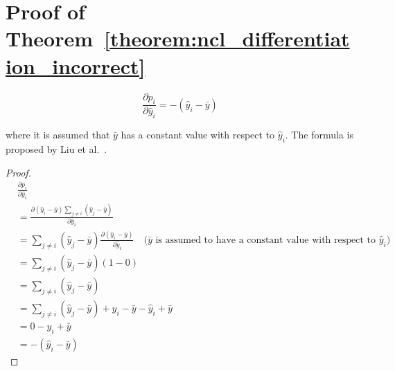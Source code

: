 \documentclass{article}
\begin{document}
\section{Proof of Theorem~\ref{theorem:ncl_differentiation_incorrect}}
\label{appendix:ncl_differentiation_incorrect}
\[
\frac{\partial{p_i}}{\partial{\hat{y}_i}} = -(\hat{y}_i - \bar{y})
\]
\begin{center}
    \begin{minipage}{0.8\linewidth}
        \small
        where it is assumed that $\bar{y}$ has a constant value with respect to $\hat{y}_i$. The formula is proposed by Liu et al.\ \cite{liu1999negative}. 
    \end{minipage}
    \begin{proof}
        \begin{align*}
            &\frac{\partial{p_i}}{\partial{\hat{y}_i}}
            \\
            &= \frac{\partial{(\hat{y}_i - \bar{y})\sum_{j \neq i} (\hat{y}_j - \bar{y})}}{\partial{\hat{y}_i}}
            \\
            &= \sum_{j \neq i} (\hat{y}_j - \bar{y}) \frac{\partial{(\hat{y}_i - \bar{y})}}{\partial{\hat{y}_i}} \quad \text{(}\bar{y}\text{ is assumed to have a constant value with respect to }\hat{y}_i\text{)}
            \\
            &= \sum_{j \neq i} (\hat{y}_j - \bar{y}) (1 - 0)
            \\
            &= \sum_{j \neq i} (\hat{y}_j - \bar{y})
            \\
            &= \sum_{j \neq i} (\hat{y}_j - \bar{y}) + \hat{y}_i - \bar{y} - \hat{y}_i + \bar{y}
            \\
            &= 0 - \hat{y}_i + \bar{y}
            \\
            &= -(\hat{y}_i - \bar{y})
        \end{align*}
    \end{proof}
\end{center}
\end{document}
